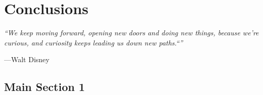 
\chapter{Conclusions} %

\label{Chapter6} %


\epigraph{\itshape ``We keep moving forward, opening new doors and doing new things, because we're curious, and curiosity keeps leading us down new paths.``''}{---Walt Disney}

\section{Main Section 1}

\lipsum[1-3]